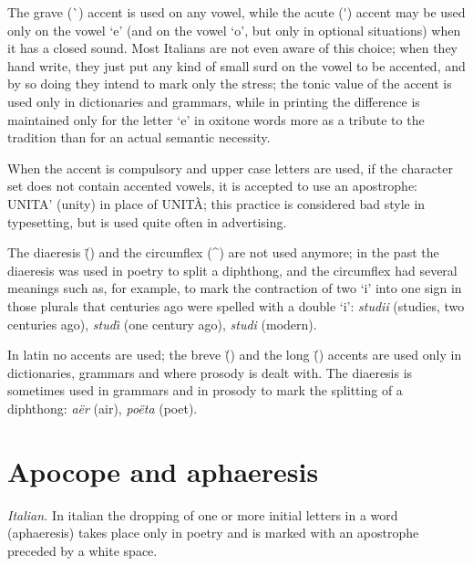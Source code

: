 The  grave (\`{}) accent is used on any vowel, while the acute (\'{}) accent
may be used only on the vowel `e'  (and  on  the  vowel  `o',  but  only  in
optional  situations) when it has a closed sound. Most Italians are not even
aware of this choice; when they hand write, they just put any kind of  small
surd  on  the vowel to be accented, and by so doing they intend to mark only
the stress; the tonic value of the accent is used only in  dictionaries  and
grammars, while in printing the difference is maintained only for the letter
`e' in oxitone words more as a tribute to the tradition than for  an  actual
semantic  necessity. 

\begin{comment}
Some  fancy character sets have both accents merged into a single horizontal
bar. 
\end{comment}

When  the  accent  is  compulsory  and  upper  case letters are used, if the
character set does not contain accented vowels, it is  accepted  to  use  an
apostrophe:  UNITA' (unity) in place of UNIT\`A; this practice is considered
bad style in typesetting, but is used quite often in advertising.

The  diaeresis (\"{}) and the circumflex (\^{}) are not used anymore; in the
past the diaeresis was  used  in  poetry  to  split  a  diphthong,  and  the
circumflex   had  several  meanings  such  as,  for  example,  to  mark  the
contraction of two `i' into one sign in those  plurals  that  centuries  ago
were  spelled  with a double `i': {\it studii} (studies, two centuries ago),
{\it stud\^\i} (one century ago), {\it studi} (modern).


 In latin no accents are used; the breve (\u{}) and the
long (\={}) accents are  used  only  in  dictionaries,  grammars  and  where
prosody  is  dealt  with. The diaeresis is sometimes used in grammars and in
prosody to mark the splitting  of  a  diphthong:  {\it  a\"er}  (air),  {\it
po\"eta} (poet).

\section{Apocope and aphaeresis}
{\it  Italian.}  In italian the dropping of one or more initial letters in a
word (aphaeresis)  takes  place  only  in  poetry  and  is  marked  with  an
apostrophe preceded by a white space.


